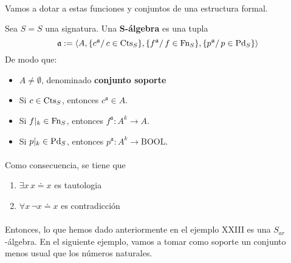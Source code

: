 \paragraph{}
Vamos a dotar a estas funciones y conjuntos de una estructura formal. 
\begin{definition}
Sea $S = \si{S}$ una signatura. Una \textbf{S-álgebra} es una tupla 
\[ \mathfrak{a} := \langle A, \{ c^{\mathfrak{a}} / \, c \in \mbox{Cts}_{S} \}, \{f^{\mathfrak{a}} / \, f \in \mbox{Fn}_{S}\}, \{p^{\mathfrak{a}} / \, p \in \mbox{Pd}_{S} \} \rangle \]
De modo que:
\begin{itemize}
    \item $A \neq \emptyset$, denominado \textbf{conjunto soporte}
    \item Si $c \in \mbox{Cts}_{S}$, entonces $c^{\mathfrak{a}} \in A$.
    \item Si $f\vert_k \in \mbox{Fn}_{S}$, entonces $f^{\mathfrak{a}}: A^{k} \rightarrow A$.
    \item Si $p\vert_k \in \mbox{Pd}_{S}$, entonces $p^{\mathfrak{a}}: A^{k} \rightarrow \mbox{BOOL}$.
\end{itemize}
\end{definition}
\paragraph{}
Como consecuencia, se tiene que 
\begin{enumerate}
	\item $\exists x \, x \doteq x  $ es tautologia
	\item $\forall x \, \neg x \doteq x  $ es contradicción
\end{enumerate}
\paragraph{}
Entonces, lo que hemos dado anteriormente en el ejemplo XXIII es una $S_{ar}$-álgebra. En el siguiente ejemplo, vamos a tomar como soporte un conjunto menos usual que los números naturales. 
